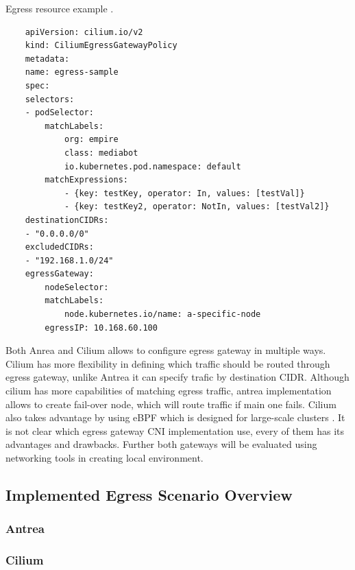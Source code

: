 \begin{listing}[htb]
    \centering
    \caption{Egress resource example \cite{AntreaEgressArch}.}
    \begin{verbatim}
    apiVersion: cilium.io/v2
    kind: CiliumEgressGatewayPolicy
    metadata:
    name: egress-sample
    spec:
    selectors:
    - podSelector:
        matchLabels:
            org: empire
            class: mediabot
            io.kubernetes.pod.namespace: default
        matchExpressions:
            - {key: testKey, operator: In, values: [testVal]}
            - {key: testKey2, operator: NotIn, values: [testVal2]}
    destinationCIDRs:
    - "0.0.0.0/0"
    excludedCIDRs:
    - "192.168.1.0/24"
    egressGateway:
        nodeSelector:
        matchLabels:
            node.kubernetes.io/name: a-specific-node
        egressIP: 10.168.60.100
    \end{verbatim}
    \label{lst:yamlCiliumEgressGatewayPolicy}
\end{listing}


Both Anrea and Cilium allows to configure egress gateway in multiple ways. Cilium has more flexibility in defining which traffic should be routed through egress gateway, unlike Antrea it can specify trafic by destination CIDR. Although cilium has more capabilities of matching egress traffic, antrea implementation allows to create fail-over node, which will route traffic if main one fails. Cilium also takes advantage by using eBPF which is designed for large-scale clusters \cite{CiliumOverview}. It is not clear which egress gateway CNI implementation use, every of them has its advantages and drawbacks. Further both gateways will be evaluated using networking tools in creating local environment.

\subsection{Implemented Egress Scenario Overview}
\label{subsection:implEgressOverview}


\subsubsection{Antrea}
\label{subsection:implAntreaEgress}


\subsubsection{Cilium}
\label{subsection:implCiliumEgress}


